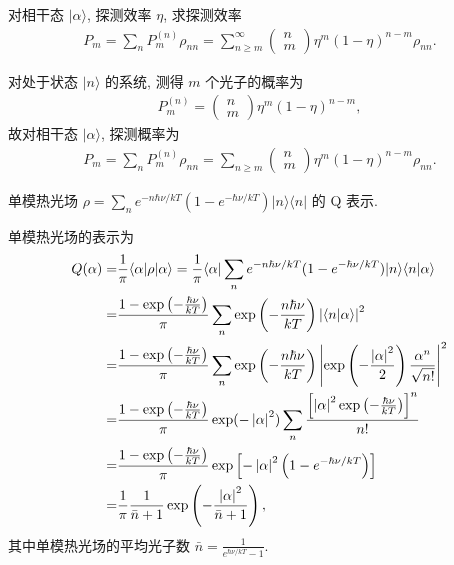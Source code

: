 \documentclass{assignment}
\begin{document}
\begin{prob}
    对相干态 $\lvert\alpha\rangle$, 探测效率 $\eta$, 求探测效率
    \begin{align}
        P_m=\sum_nP_m^{(n)}\rho_{nn}=\sum_{n\geq m}^{\infty}\begin{pmatrix}
            n\\
            m
        \end{pmatrix}\eta^m(1-\eta)^{n-m}\rho_{nn}.
    \end{align}
\end{prob}
\begin{sol}
    对处于状态 $\lvert n\rangle$ 的系统, 测得 $m$ 个光子的概率为
    \begin{align}
        P_m^{(n)}=\begin{pmatrix}
            n\\
            m
        \end{pmatrix}\eta^m(1-\eta)^{n-m},
    \end{align}
    故对相干态 $\lvert\alpha\rangle$, 探测概率为
    \begin{align}
        P_m=\sum_nP_m^{(n)}\rho_{nn}=\sum_{n\geq m}\begin{pmatrix}
            n\\
            m
        \end{pmatrix}\eta^m(1-\eta)^{n-m}\rho_{nn}.
    \end{align}
\end{sol}

\begin{prob}
    单模热光场 $\rho=\sum_ne^{-n\hbar\nu/kT}(1-e^{-\hbar\nu/kT})\lvert n\rangle\langle n\rvert$ 的 Q 表示.
\end{prob}
\begin{sol}
    单模热光场的表示为
    \begin{align}
        \notag Q(\alpha)=&\frac{1}{\pi}\langle\alpha\rvert\rho\lvert\alpha\rangle=\frac{1}{\pi}\langle\alpha\rvert\sum_ne^{-n\hbar\nu/kT}(1-e^{-\hbar\nu/kT})\lvert n\rangle\langle n\vert\alpha\rangle\\
        \notag=&\frac{1-\exp\left(-\frac{\hbar\nu}{kT}\right)}{\pi}\sum_n\exp\left(-\frac{n\hbar\nu}{kT}\right)\left\lvert\langle n\vert\alpha\rangle\right\rvert^2\\
        \notag=&\frac{1-\exp\left(-\frac{\hbar\nu}{kT}\right)}{\pi}\sum_n\exp\left(-\frac{n\hbar\nu}{kT}\right)\left\lvert\exp\left(-\frac{\left\lvert\alpha\right\rvert^2}{2}\right)\frac{\alpha^n}{\sqrt{n!}}\right\rvert^2\\
        \notag=&\frac{1-\exp\left(-\frac{\hbar\nu}{kT}\right)}{\pi}\exp(-\left\lvert\alpha\right\rvert^2)\sum_n\frac{\left[\left\lvert\alpha\right\rvert^2\exp\left(-\frac{\hbar\nu}{kT}\right)\right]^n}{n!}\\
        \notag=&\frac{1-\exp\left(-\frac{\hbar\nu}{kT}\right)}{\pi}\exp\left[-\left\lvert\alpha\right\rvert^2\left(1-e^{-\hbar\nu/kT}\right)\right]\\
        =&\frac{1}{\pi}\frac{1}{\bar{n}+1}\exp\left(-\frac{\left\lvert\alpha\right\rvert^2}{\bar{n}+1}\right),
    \end{align}
    其中单模热光场的平均光子数 $\bar{n}=\frac{1}{e^{\hbar\nu/kT}-1}$.
\end{sol}
\end{document}
